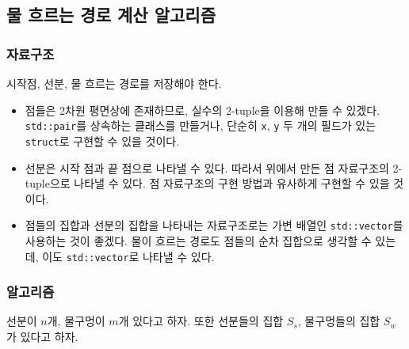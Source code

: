\subsection{물 흐르는 경로 계산 알고리즘}

\subsubsection{자료구조}

시작점, 선분, 물 흐르는 경로를 저장해야 한다.

\begin{itemize}
	\item 점들은 2차원 평면상에 존재하므로, 실수의 2-tuple을 이용해 만들 수 있겠다. \texttt{std::pair}를 상속하는 클래스를
	만들거나, 단순히 \texttt{x}, \texttt{y} 두 개의 필드가 있는 \texttt{struct}로 구현할 수 있을 것이다.
	\item 선분은 시작 점과 끝 점으로 나타낼 수 있다. 따라서 위에서 만든 점 자료구조의 2-tuple으로 나타낼 수 있다.
	점 자료구조의 구현 방법과 유사하게 구현할 수 있을 것이다.
	\item 점들의 집합과 선분의 집합을 나타내는 자료구조로는 가변 배열인 \texttt{std::vector}를 사용하는 것이 좋겠다.
	물이 흐르는 경로도 점들의 순차 집합으로 생각할 수 있는데, 이도 \texttt{std::vector}로 나타낼 수 있다.
\end{itemize}

\subsubsection{알고리즘} 선분이 $n$개, 물구멍이 $m$개 있다고 하자. 또한 선분들의 집합 $S_s$, 물구멍들의 집합 $S_w$가 있다고 하자.

